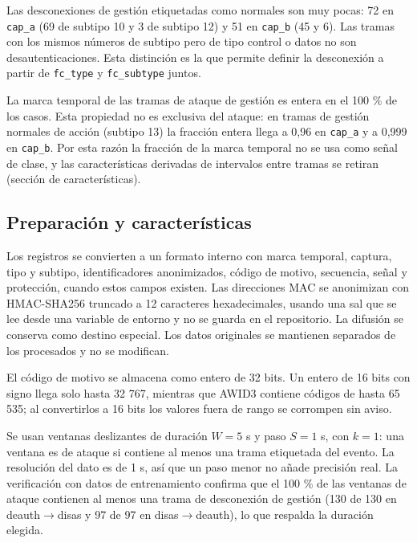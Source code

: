 \documentclass[journal]{IEEEtran}
\begin{document}
Las desconexiones de gestión etiquetadas como normales son muy pocas: 72 en \texttt{cap\_a} (69 de subtipo 10 y 3 de subtipo 12) y 51 en \texttt{cap\_b} (45 y 6). Las tramas con los mismos números de subtipo pero de tipo control o datos no son desautenticaciones. Esta distinción es la que permite definir la desconexión a partir de \texttt{fc\_type} y \texttt{fc\_subtype} juntos.

La marca temporal de las tramas de ataque de gestión es entera en el 100 \% de los casos. Esta propiedad no es exclusiva del ataque: en tramas de gestión normales de acción (subtipo 13) la fracción entera llega a 0,96 en \texttt{cap\_a} y a 0,999 en \texttt{cap\_b}. Por esta razón la fracción de la marca temporal no se usa como señal de clase, y las características derivadas de intervalos entre tramas se retiran (sección de características).

\subsection{Preparación y características}

Los registros se convierten a un formato interno con marca temporal, captura, tipo y subtipo, identificadores anonimizados, código de motivo, secuencia, señal y protección, cuando estos campos existen. Las direcciones MAC se anonimizan con HMAC-SHA256 truncado a 12 caracteres hexadecimales, usando una sal que se lee desde una variable de entorno y no se guarda en el repositorio. La difusión se conserva como destino especial. Los datos originales se mantienen separados de los procesados y no se modifican.

El código de motivo se almacena como entero de 32 bits. Un entero de 16 bits con signo llega solo hasta 32 767, mientras que AWID3 contiene códigos de hasta 65 535; al convertirlos a 16 bits los valores fuera de rango se corrompen sin aviso.

Se usan ventanas deslizantes de duración $W = 5$ s y paso $S = 1$ s, con $k=1$: una ventana es de ataque si contiene al menos una trama etiquetada del evento. La resolución del dato es de 1 s, así que un paso menor no añade precisión real. La verificación con datos de entrenamiento confirma que el 100 \% de las ventanas de ataque contienen al menos una trama de desconexión de gestión (130 de 130 en deauth$\rightarrow$disas y 97 de 97 en disas$\rightarrow$deauth), lo que respalda la duración elegida.
\end{document}
